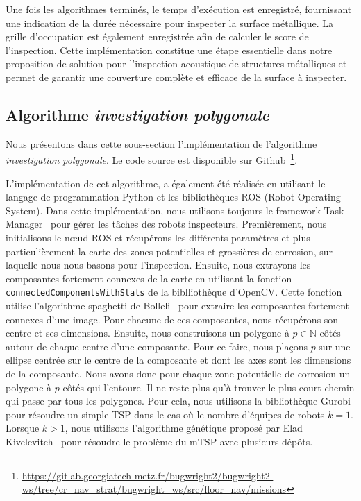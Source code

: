 \documentclass[francais,RandD]{rapportPFE}
\begin{document}
			Une fois les algorithmes terminés, le temps d'exécution est enregistré, fournissant une indication de la durée nécessaire pour inspecter la surface métallique.
			La grille d'occupation est également enregistrée afin de calculer le score de l'inspection.
			Cette implémentation constitue une étape essentielle dans notre proposition de solution pour l'inspection acoustique de structures métalliques et permet de garantir une couverture complète et efficace de la surface à inspecter.
		\subsection*{Algorithme \textit{investigation polygonale}}
			Nous présentons dans cette sous-section l'implémentation de l'algorithme \textit{investigation polygonale}.
			Le code source est disponible sur Github~\footnote{\url{https://gitlab.georgiatech-metz.fr/bugwright2/bugwright2-ws/tree/cr_nav_strat/bugwright_ws/src/floor_nav/missions}}.

			L'implémentation de cet algorithme, a également été réalisée en utilisant le langage de programmation Python et les bibliothèques ROS (Robot Operating System).
			Dans cette implémentation, nous utilisons toujours le framework Task Manager~\cite{ROSTaskManager} pour gérer les tâches des robots inspecteurs.
			Premièrement, nous initialisons le nœud ROS et récupérons les différents paramètres et plus particulièrement la carte des zones potentielles et grossières de corrosion, sur laquelle nous nous basons pour l'inspection.
			Ensuite, nous extrayons les composantes fortement connexes de la carte en utilisant la fonction \texttt{connectedComponentsWithStats} de la biblliothèque d'OpenCV.
			Cette fonction utilise l'algorithme spaghetti de Bolleli~\cite{BolelliSpaghetti} pour extraire les composantes fortement connexes d'une image.
			Pour chacune de ces composantes, nous récupérons son centre et ses dimensions.
			Ensuite, nous construisons un polygone à $p \in \mathbb{N}$ côtés autour de chaque centre d'une composante.
			Pour ce faire, nous plaçons $p$ sur une ellipse centrée sur le centre de la composante et dont les axes sont les dimensions de la composante.
			Nous avons donc pour chaque zone potentielle de corrosion un polygone à $p$ côtés qui l'entoure.
			Il ne reste plus qu'à trouver le plus court chemin qui passe par tous les polygones.
			Pour cela, nous utilisons la bibliothèque Gurobi pour résoudre un simple TSP dans le cas où le nombre d'équipes de robots $k = 1$.
			Lorsque $k > 1$, nous utilisons l'algorithme génétique proposé par Elad Kivelevitch~\cite{MDMTSPV_GA} pour résoudre le problème du mTSP avec plusieurs dépôts.
\end{document}
